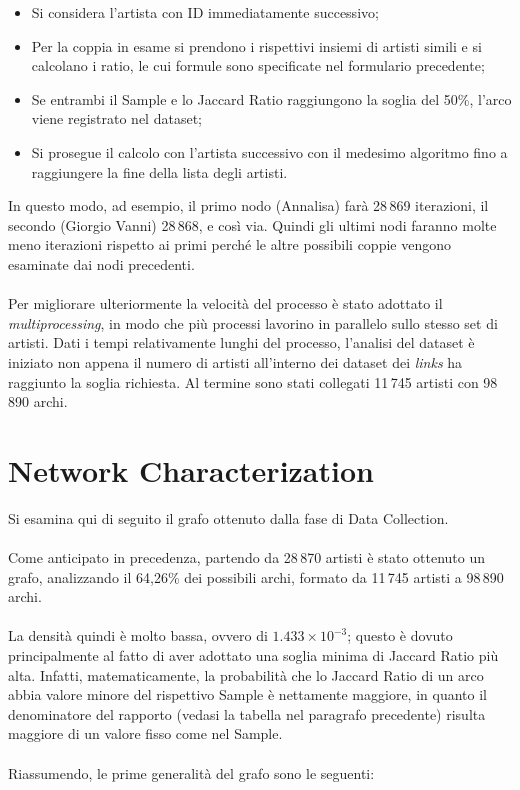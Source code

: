 \documentclass[sigchi]{acmart}
\begin{document}
\begin{itemize}
\item Si considera l'artista con ID immediatamente successivo;
\item Per la coppia in esame si prendono i rispettivi insiemi di artisti simili e si calcolano i ratio, le cui formule sono specificate nel formulario precedente;
\item Se entrambi il Sample e lo Jaccard Ratio raggiungono la soglia del 50\%, l'arco viene registrato nel dataset;
\item Si prosegue il calcolo con l'artista successivo con il medesimo algoritmo fino a raggiungere la fine della lista degli artisti.
\end{itemize}
In questo modo, ad esempio, il primo nodo (Annalisa) farà 28\,869 iterazioni, il secondo (Giorgio Vanni) 28\,868, e così via. Quindi gli ultimi nodi faranno molte meno iterazioni rispetto ai primi perché le altre possibili coppie vengono esaminate dai nodi precedenti. \\ \\ Per migliorare ulteriormente la velocità del processo è stato adottato il {\itshape multiprocessing}, in modo che più processi lavorino in parallelo sullo stesso set di artisti. Dati i tempi relativamente lunghi del processo, l'analisi del dataset è iniziato non appena il numero di artisti all'interno dei dataset dei {\itshape links} ha raggiunto la soglia richiesta. Al termine sono stati collegati 11\,745 artisti con 98\,890 archi.


\section{Network Characterization}

Si esamina qui di seguito il grafo ottenuto dalla fase di Data Collection. \\ \\ Come anticipato in precedenza, partendo da 28\,870 artisti è stato ottenuto un grafo, analizzando il 64,26\% dei possibili archi, formato da 11\,745 artisti a 98\,890 archi. \\ \\ La densità quindi è molto bassa, ovvero di $ 1.433 \times 10^{-3}$; questo è dovuto principalmente al fatto di aver adottato una soglia minima di Jaccard Ratio più alta. Infatti, matematicamente, la probabilità che lo Jaccard Ratio di un arco abbia valore minore del rispettivo Sample è nettamente maggiore, in quanto il denominatore del rapporto (vedasi la tabella nel paragrafo precedente) risulta maggiore di un valore fisso come nel Sample. \\ \\ Riassumendo, le prime generalità del grafo sono le seguenti:
\end{document}
